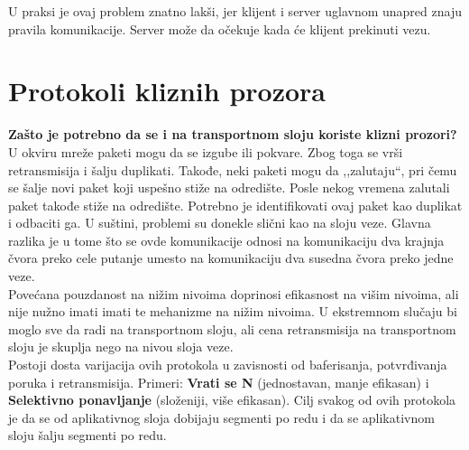 \documentclass[a4paper]{article}
\begin{document}
        U praksi je ovaj problem znatno lakši, jer klijent i server uglavnom unapred znaju
        pravila komunikacije. Server može da očekuje kada će klijent prekinuti vezu.

\section{Protokoli kliznih prozora}
    \textbf{Zašto je potrebno da se i na transportnom sloju koriste klizni prozori?} 
    U okviru mreže paketi mogu da se izgube ili pokvare. Zbog toga se vrši retransmisija i šalju 
    duplikati. Takođe, neki paketi mogu da ,,zalutaju``, pri čemu se šalje novi paket koji uspešno 
    stiže na odredište. Posle nekog vremena zalutali paket takođe stiže na odredište. Potrebno je 
    identifikovati ovaj paket kao duplikat i odbaciti ga. U suštini, problemi su donekle slični kao
    na sloju veze. Glavna razlika je u tome što se ovde komunikacije odnosi na komunikaciju
    dva krajnja čvora preko cele putanje umesto na komunikaciju dva susedna čvora preko jedne veze.\\
    \indent Povećana pouzdanost na nižim nivoima doprinosi efikasnost na višim nivoima, ali nije
    nužno imati imati te mehanizme na nižim nivoima. U ekstremnom slučaju bi moglo sve da radi
    na transportnom sloju, ali cena retransmisija na transportnom sloju je skuplja nego
    na nivou sloja veze. \\
    \indent Postoji dosta varijacija ovih protokola u zavisnosti od baferisanja, potvrđivanja
    poruka i retransmisija. Primeri: \textbf{Vrati se N} (jednostavan, manje efikasan) i
    \textbf{Selektivno ponavljanje} (složeniji, više efikasan). Cilj svakog od ovih
    protokola je da se od aplikativnog sloja dobijaju segmenti po redu i da se aplikativnom
    sloju šalju segmenti po redu.
\end{document}
